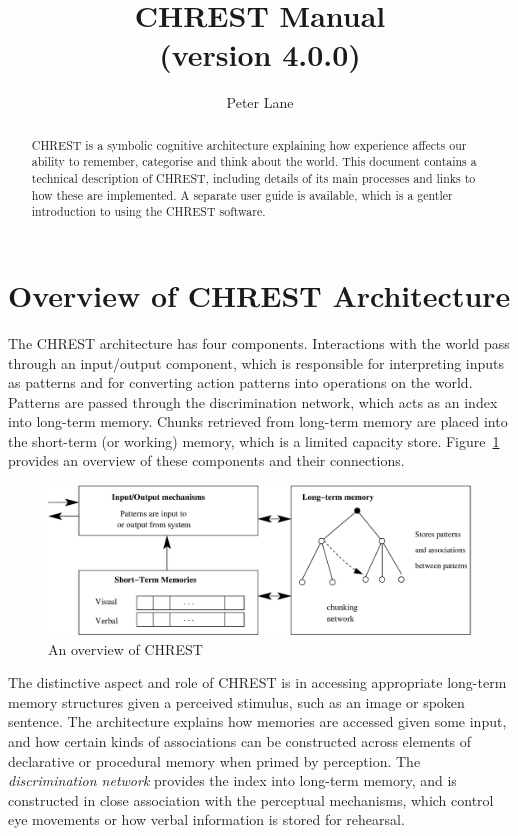 \documentclass{article}
\title{CHREST Manual \\ (version 4.0.0)}
\author{Peter Lane}
\begin{document}
\maketitle

\begin{abstract}

\noindent CHREST is a symbolic cognitive architecture explaining how experience
affects our ability to remember, categorise and think about the world.  This
document contains a technical description of CHREST, including details of its
main processes and links to how these are implemented.  A separate user guide
is available, which is a gentler introduction to using the CHREST software.

\end{abstract}

\tableofcontents
\newpage

\section{Overview of CHREST Architecture}

The CHREST architecture has four components.  Interactions with the world pass
through an input/output component, which is responsible for interpreting inputs
as patterns and for converting action patterns into operations on the world.
Patterns are passed through the discrimination network, which acts as an index
into long-term memory.  Chunks retrieved from long-term memory are placed into
the short-term (or working) memory, which is a limited capacity store.
Figure~\ref{chrest-architecture} provides an overview of these components and
their connections.

\begin{figure}
\includegraphics[width=\textwidth]{figures/chrest.eps}
\caption{An overview of CHREST}
\label{chrest-architecture}
\end{figure}

The distinctive aspect and role of CHREST is in accessing appropriate long-term
memory structures given a perceived stimulus, such as an image or spoken
sentence.  The architecture explains how memories are accessed given some
input, and how certain kinds of associations can be constructed across elements
of declarative or procedural memory when primed by perception.  The {\em
discrimination network} provides the index into long-term memory, and is constructed
in close association with the perceptual mechanisms, which control eye
movements or how verbal information is stored for rehearsal.
\end{document}
